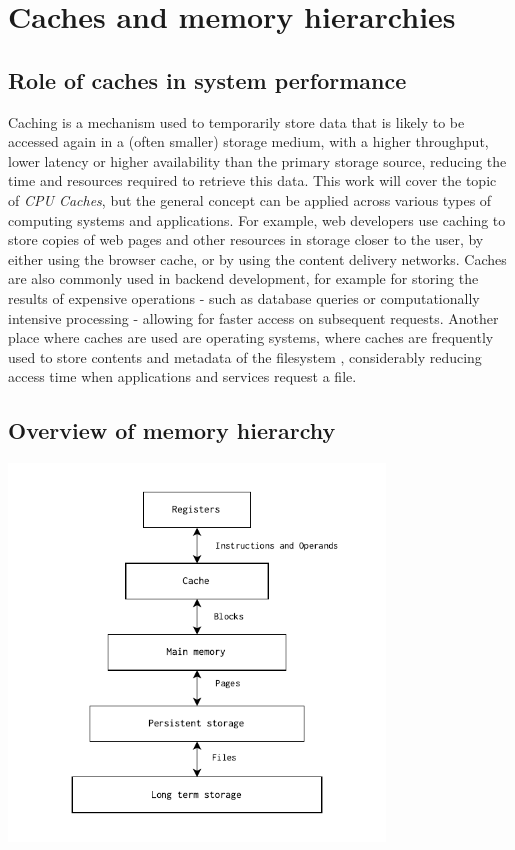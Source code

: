 \section{Caches and memory hierarchies}

\subsection{Role of caches in system performance}

Caching is a mechanism used to temporarily store data that is likely to be accessed again in a (often smaller) storage medium, with a higher throughput, lower latency or higher
availability than the primary storage source, reducing the time and resources required to retrieve this data.
This work will cover the topic of \textit{CPU Caches}, but the general concept can be applied across
various types of computing systems and applications.
For example, web developers use caching to store copies of web pages and other resources in storage closer to the user, by either using the browser cache, or by using the content delivery networks.
Caches are also commonly used in backend development, for example for storing the results of expensive operations - such as database queries or computationally intensive processing -
allowing for faster access on subsequent requests. Another place where caches are used are operating systems, where caches are frequently used to store contents and metadata of
the filesystem \cite{linuxfscache}, considerably reducing access time when applications and services request a file.

\subsection{Overview of memory hierarchy} \label{sec:memhier}

\begin{center}
	\centering
	\includegraphics[width=0.75\textwidth]{figures/02-background/memhier.pdf}
	\label{fig:memhier}
\end{center}


